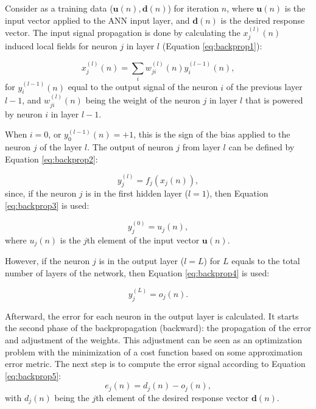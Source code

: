 \documentclass[ruled,graybox]{svmult}
\begin{document}
Consider as a training data ($\mathbf{u}(n), \mathbf{d}(n)$) for iteration $n$, where $\mathbf{u}(n)$ is the input vector applied to the ANN input layer, and $\mathbf{d}(n)$ is the desired response vector. The input signal propagation is done by calculating the $x_j^{(l)}(n)$ induced local fields for neuron $j$ in layer $l$ (Equation \ref{eq:backprop1}):

\begin{equation}
\label{eq:backprop1}
    x_j^{(l)}(n) = \sum_i w_{ji}^{(l)}(n) y_i^{(l-1)}(n),
\end{equation}
for $y_i^{(l-1)}(n)$ equal to the output signal of the neuron $i$ of the previous layer $l-1$, and $w_{ji}^{(l)}(n)$ being the weight of the neuron $j$ in layer $l$ that is powered by neuron $i$ in layer $l-1$.

When $i=0$, or $y_0^{(l-1)}(n) = +1$, this is the sign of the bias applied to the neuron $j$ of the layer $l$. The output of neuron $j$ from layer $l$ can be defined by Equation \ref{eq:backprop2}:

\begin{equation}
\label{eq:backprop2}
    y_j^{(l)} = f_j (x_j (n) ),
\end{equation}
since, if the neuron $j$ is in the first hidden layer ($l = 1$), then Equation \ref{eq:backprop3} is used:

\begin{equation}
    \label{eq:backprop3}
    y_j^{(0)} = u_j (n),
\end{equation}
where $u_j(n)$ is the $j$th element of the input vector $\mathbf{u}(n)$. 

However, if the neuron $j$ is in the output layer ($l = L$) for $L$ equals to the total number of layers of the network, then Equation \ref{eq:backprop4} is used:

\begin{equation}
    \label{eq:backprop4}
    y_j^{(L)} = o_j (n).
\end{equation}

Afterward, the error for each neuron in the output layer is calculated. It starts the second phase of the backpropagation (backward): the propagation of the error and adjustment of the weights. This adjustment can be seen as an optimization problem with the minimization of a cost function based on some approximation error metric. The next step is to compute the error signal according to Equation \ref{eq:backprop5}:
\begin{equation}
    \label{eq:backprop5}
    e_j (n) = d_j(n) - o_j (n),
\end{equation}
with $d_j (n)$ being the $j$th element of the desired response vector $\mathbf{d}(n)$.
\end{document}
